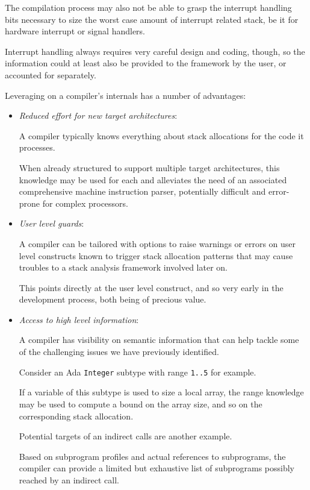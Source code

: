 The compilation process may also not be able to grasp the interrupt handling
bits necessary to size the worst case amount of interrupt related stack, be it
for hardware interrupt or signal handlers.

Interrupt handling always requires very careful design and coding, though, so
the information could at least also be provided to the framework by the user,
or accounted for separately.

Leveraging on a compiler's internals has a number of advantages:

\begin {itemize}
\item {\it Reduced effort for new target architectures}:

A compiler typically knows everything about stack allocations for the code it
processes.

When already structured to support multiple target architectures, this
knowledge may be used for each and alleviates the need of an associated
comprehensive machine instruction parser, potentially difficult and
error-prone for complex processors.

\item {\it User level guards}:

A compiler can be tailored with options to raise warnings or errors on user
level constructs known to trigger stack allocation patterns that may cause
troubles to a stack analysis framework involved later on.

This points directly at the user level construct, and so very early in the
development process, both being of precious value.

\item {\it Access to high level information}:

A compiler has visibility on semantic information that can help tackle some of
the challenging issues we have previously identified.

Consider an Ada \verb|Integer| subtype with range \verb|1..5| for
example.

If a variable of this subtype is used to size a local array, the range
knowledge may be used to compute a bound on the array size, and so on the
corresponding stack allocation.

Potential targets of an indirect calls are another example.

Based on subprogram profiles and actual references to subprograms, the
compiler can provide a limited but exhaustive list of subprograms possibly
reached by an indirect call.


\end{itemize}

